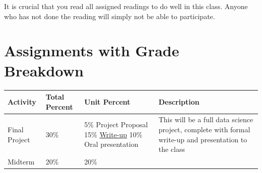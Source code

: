 \documentclass[
]{book}
\begin{document}
It is crucial that you read all assigned readings to do well in this class. Anyone who has not done the reading will simply not be able to participate.

\hypertarget{assignments-with-grade-breakdown}{%
\section{Assignments with Grade Breakdown}\label{assignments-with-grade-breakdown}}

\begin{longtable}[]{@{}llll@{}}
\toprule
\begin{minipage}[b]{0.22\columnwidth}\raggedright
Activity\strut
\end{minipage} & \begin{minipage}[b]{0.22\columnwidth}\raggedright
Total Percent\strut
\end{minipage} & \begin{minipage}[b]{0.22\columnwidth}\raggedright
Unit Percent\strut
\end{minipage} & \begin{minipage}[b]{0.22\columnwidth}\raggedright
Description\strut
\end{minipage}\tabularnewline
\midrule
\endhead
\begin{minipage}[t]{0.22\columnwidth}\raggedright
Final Project\strut
\end{minipage} & \begin{minipage}[t]{0.22\columnwidth}\raggedright
30\%\strut
\end{minipage} & \begin{minipage}[t]{0.22\columnwidth}\raggedright
5\% Project Proposal 15\% \href{}{Write-up} 10\% Oral presentation\strut
\end{minipage} & \begin{minipage}[t]{0.22\columnwidth}\raggedright
This will be a full data science project, complete with formal write-up and presentation to the class\strut
\end{minipage}\tabularnewline
\begin{minipage}[t]{0.22\columnwidth}\raggedright
Midterm\strut
\end{minipage} & \begin{minipage}[t]{0.22\columnwidth}\raggedright
20\%\strut
\end{minipage} & \begin{minipage}[t]{0.22\columnwidth}\raggedright
20\%\strut
\end{minipage} & \begin{minipage}[t]{0.22\columnwidth}\raggedright

\end{minipage}
\end{longtable}
\end{document}
